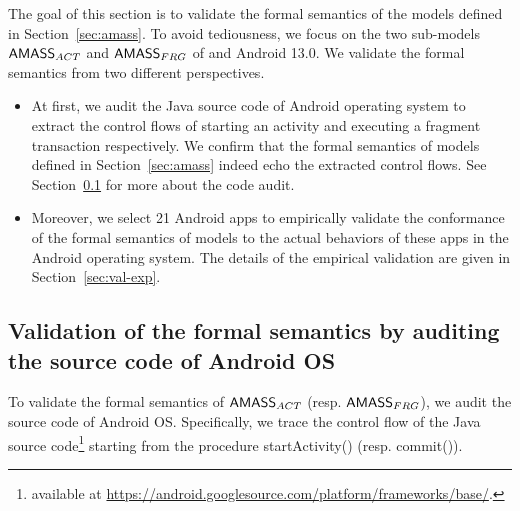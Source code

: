 

The goal of this section is to validate the formal semantics of the {\AMASS} models defined in Section~\ref{sec:amass}.  
To avoid tediousness, we focus on the two sub-models $\textsf{AMASS}_{ACT}$ and $\textsf{AMASS}_{FRG}$ of {\AMASS} %
and Android 13.0. 
%
We validate the formal semantics from two different perspectives. 
\begin{itemize}
\item At first, we audit the Java source code of Android operating system to extract the control flows of starting an activity and executing a fragment transaction respectively. We confirm that the formal semantics of {\AMASS} models defined in Section~\ref{sec:amass} indeed echo the extracted control flows. See Section~\ref{sec:val-code} for more about the code audit. 
%
\item Moreover, we select 21 Android apps to empirically validate the conformance of the formal semantics of {\AMASS} models to the actual behaviors of these apps in the Android operating system. The details of the empirical validation are given in Section~\ref{sec:val-exp}. 
\end{itemize}


\subsection{Validation of the formal semantics by auditing the source code of Android OS}\label{sec:val-code}
%
To validate the formal semantics of $\textsf{AMASS}_{ACT}$ (resp. $\textsf{AMASS}_{FRG}$), we audit the source code of Android OS. Specifically, we trace the control flow of the Java source code\footnote{available at \url{https://android.googlesource.com/platform/frameworks/base/}.} starting from the procedure startActivity() (resp. commit()). %


